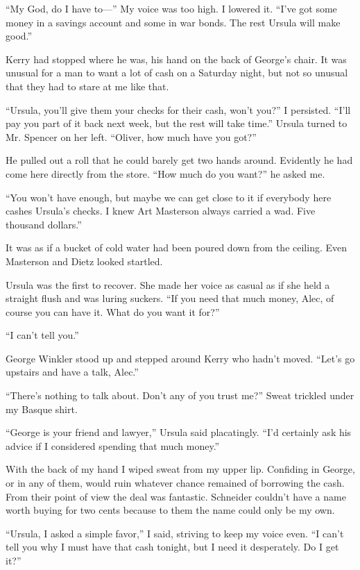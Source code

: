 \documentclass{novel}
\begin{document}
“My God, do I have to—” My voice was too high. I lowered it. “I’ve got some money in a savings account and some in war bonds. The rest Ursula will make good.”

Kerry had stopped where he was, his hand on the back of George’s chair. It was unusual for a man to want a lot of cash on a Saturday night, but not so unusual that they had to stare at me like that.

“Ursula, you’ll give them your checks for their cash, won’t you?” I persisted. “I’ll pay you part of it back next week, but the rest will take time.” Ursula turned to Mr. Spencer on her left. “Oliver, how much have you got?”

He pulled out a roll that he could barely get two hands around. Evidently he had come here directly from the store. “How much do you want?” he asked me.

“You won’t have enough, but maybe we can get close to it if everybody here cashes Ursula’s checks. I knew Art Masterson always carried a wad. Five thousand dollars.”

It was as if a bucket of cold water had been poured down from the ceiling. Even Masterson and Dietz looked startled.

Ursula was the first to recover. She made her voice as casual as if she held a straight flush and was luring suckers. “If you need that much money, Alec, of course you can have it. What do you want it for?”

“I can’t tell you.”

George Winkler stood up and stepped around Kerry who hadn’t moved. “Let’s go upstairs and have a talk, Alec.”

“There’s nothing to talk about. Don’t any of you trust me?” Sweat trickled under my Basque shirt.

“George is your friend and lawyer,” Ursula said placatingly. “I’d certainly ask his advice if I considered spending that much money.”

With the back of my hand I wiped sweat from my upper lip. Confiding in George, or in any of them, would ruin whatever chance remained of borrowing the cash. From their point of view the deal was fantastic. Schneider couldn’t have a name worth buying for two cents because to them the name could only be my own.

“Ursula, I asked a simple favor,” I said, striving to keep my voice even. “I can’t tell you why I must have that cash tonight, but I need it desperately. Do I get it?”
\end{document}
